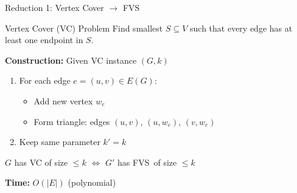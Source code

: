 \documentclass[aspectratio=169]{beamer}
\newcommand{\fvs}{\textsc{FVS}}
\begin{document}
\begin{frame}{Reduction 1: Vertex Cover $\rightarrow$ \fvs}
  \begin{block}{Vertex Cover (VC) Problem}
    Find smallest $S \subseteq V$ such that every edge has at least one endpoint in $S$.
  \end{block}
  
  \vspace{0.3cm}
  
  \textbf{Construction:} Given VC instance $(G,k)$
  \begin{enumerate}
    \item For each edge $e = (u,v) \in E(G)$:
    \begin{itemize}
      \item Add new vertex $w_e$
      \item Form triangle: edges $(u,v)$, $(u,w_e)$, $(v,w_e)$
    \end{itemize}
    \item Keep same parameter $k' = k$
  \end{enumerate}
  
  \vspace{0.3cm}
  
  \begin{theorem}
    $G$ has VC of size $\leq k$ $\Leftrightarrow$ $G'$ has \fvs\ of size $\leq k$
  \end{theorem}
  
  \textbf{Time:} $O(|E|)$ (polynomial)
\end{frame}
\end{document}
